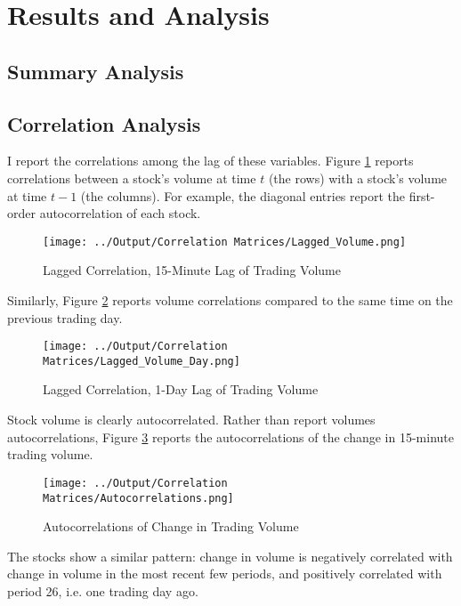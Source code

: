 \documentclass[12pt]{article}
\begin{document}
\section{Results and Analysis}
\subsection{Summary Analysis}
\subsection{Correlation Analysis}
I report the correlations among the lag of these variables. Figure \ref{fig:lagged_volume} reports correlations between a stock's volume at time $t$ (the rows) with a stock's volume at time $t-1$ (the columns). For example, the diagonal entries report the first-order autocorrelation of each stock.

\begin{figure}[H]
    \centering
    \caption{Lagged Correlation, 15-Minute Lag of Trading Volume}
    \texttt{[image: ../Output/Correlation Matrices/Lagged\_Volume.png]}
    \label{fig:lagged_volume}
\end{figure}

Similarly, Figure \ref{fig:lagged_volume_day} reports volume correlations compared to the same time on the previous trading day.

\begin{figure}[H]
    \centering
    \caption{Lagged Correlation, 1-Day Lag of Trading Volume}
    \texttt{[image: ../Output/Correlation Matrices/Lagged\_Volume\_Day.png]}
    \label{fig:lagged_volume_day}
\end{figure}

Stock volume is clearly autocorrelated. Rather than report volumes autocorrelations, Figure \ref{fig:autocorrelations} reports the autocorrelations of the change in 15-minute trading volume. 

\begin{figure}[H]
    \centering
    \caption{Autocorrelations of Change in Trading Volume}
    \texttt{[image: ../Output/Correlation Matrices/Autocorrelations.png]}
    \label{fig:autocorrelations}
\end{figure}

The stocks show a similar pattern: change in volume is negatively correlated with change in volume in the most recent few periods, and positively correlated with period 26, i.e. one trading day ago.
\end{document}
